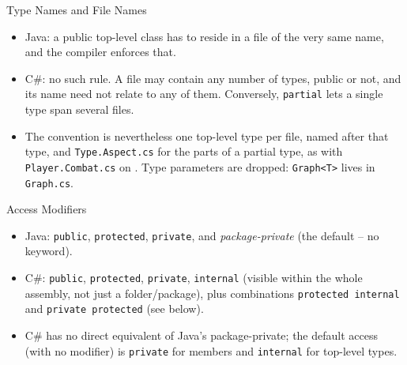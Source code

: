 \begin{frame}{Type Names and File Names}
  \begin{itemize}
    \item Java: a public top-level class has to reside in a file of the very
      same name, and the compiler enforces that.
    \item C\#: no such rule. A file may contain any number of types, public or
      not, and its name need not relate to any of them. Conversely,
      \texttt{partial} lets a single type span several files.
    \item The convention is nevertheless one top-level type per file, named
      after that type, and \texttt{Type.Aspect.cs} for the parts of a partial
      type, as with \texttt{Player.Combat.cs} on . Type
      parameters are
      dropped: \texttt{Graph<T>} lives in \texttt{Graph.cs}.
  \end{itemize}

  \vspace{1ex}

\end{frame}

\begin{frame}{Access Modifiers}
  \begin{itemize}
    \item Java: \texttt{public}, \texttt{protected}, \texttt{private},
      and \emph{package-private} (the default -- no keyword).
    \item C\#: \texttt{public}, \texttt{protected}, \texttt{private},
      \texttt{internal} (visible within the whole assembly, not just a
      folder/package), plus combinations
      \texttt{protected internal} and \texttt{private protected} (see below).
    \item C\# has no direct equivalent of Java's package-private; the
      default access (with no modifier) is \texttt{private} for members
      and \texttt{internal} for top-level types.
  \end{itemize}
\end{frame}

